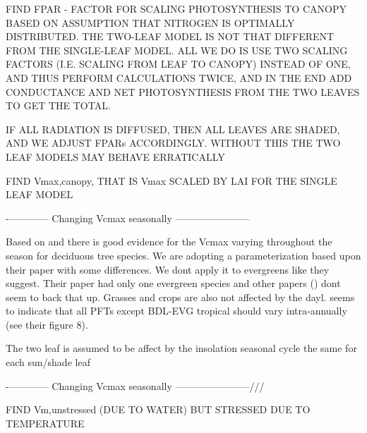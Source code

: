 F\+I\+N\+D F\+P\+A\+R -\/ F\+A\+C\+T\+O\+R F\+O\+R S\+C\+A\+L\+I\+N\+G P\+H\+O\+T\+O\+S\+Y\+N\+T\+H\+E\+S\+I\+S T\+O C\+A\+N\+O\+P\+Y B\+A\+S\+E\+D O\+N A\+S\+S\+U\+M\+P\+T\+I\+O\+N T\+H\+A\+T N\+I\+T\+R\+O\+G\+E\+N I\+S O\+P\+T\+I\+M\+A\+L\+L\+Y D\+I\+S\+T\+R\+I\+B\+U\+T\+E\+D. T\+H\+E T\+W\+O-\/\+L\+E\+A\+F M\+O\+D\+E\+L I\+S N\+O\+T T\+H\+A\+T D\+I\+F\+F\+E\+R\+E\+N\+T F\+R\+O\+M T\+H\+E S\+I\+N\+G\+L\+E-\/\+L\+E\+A\+F M\+O\+D\+E\+L. A\+L\+L W\+E D\+O I\+S U\+S\+E T\+W\+O S\+C\+A\+L\+I\+N\+G F\+A\+C\+T\+O\+R\+S (I.\+E. S\+C\+A\+L\+I\+N\+G F\+R\+O\+M L\+E\+A\+F T\+O C\+A\+N\+O\+P\+Y) I\+N\+S\+T\+E\+A\+D O\+F O\+N\+E, A\+N\+D T\+H\+U\+S P\+E\+R\+F\+O\+R\+M C\+A\+L\+C\+U\+L\+A\+T\+I\+O\+N\+S T\+W\+I\+C\+E, A\+N\+D I\+N T\+H\+E E\+N\+D A\+D\+D C\+O\+N\+D\+U\+C\+T\+A\+N\+C\+E A\+N\+D N\+E\+T P\+H\+O\+T\+O\+S\+Y\+N\+T\+H\+E\+S\+I\+S F\+R\+O\+M T\+H\+E T\+W\+O L\+E\+A\+V\+E\+S T\+O G\+E\+T T\+H\+E T\+O\+T\+A\+L.

I\+F A\+L\+L R\+A\+D\+I\+A\+T\+I\+O\+N I\+S D\+I\+F\+F\+U\+S\+E\+D, T\+H\+E\+N A\+L\+L L\+E\+A\+V\+E\+S A\+R\+E S\+H\+A\+D\+E\+D, A\+N\+D W\+E A\+D\+J\+U\+S\+T F\+P\+A\+Rs A\+C\+C\+O\+R\+D\+I\+N\+G\+L\+Y. W\+I\+T\+H\+O\+U\+T T\+H\+I\+S T\+H\+E T\+W\+O L\+E\+A\+F M\+O\+D\+E\+L\+S M\+A\+Y B\+E\+H\+A\+V\+E E\+R\+R\+A\+T\+I\+C\+A\+L\+L\+Y

F\+I\+N\+D Vmax,canopy, T\+H\+A\+T I\+S Vmax S\+C\+A\+L\+E\+D B\+Y L\+A\+I F\+O\+R T\+H\+E S\+I\+N\+G\+L\+E L\+E\+A\+F M\+O\+D\+E\+L

-\/------------ Changing Vcmax seasonally -----------------------

Based on \cite{Bauerle2012-c29} and \cite{Alton2017-pd} there is good evidence for the Vcmax varying throughout the season for deciduous tree species. We are adopting a parameterization based upon their paper with some differences. We don\textquotesingle{}t apply it to evergreens like they suggest. Their paper had only one evergreen species and other papers (\cite{Miyazawa2006-so}) don\textquotesingle{}t seem to back that up. Grasses and crops are also not affected by the dayl. \cite{Alton2017-pd} seems to indicate that all P\+F\+Ts except B\+D\+L-\/\+E\+V\+G tropical should vary intra-\/annually (see their figure 8).

The two leaf is assumed to be affect by the insolation seasonal cycle the same for each sun/shade leaf

-\/------------ Changing Vcmax seasonally -----------------------///

F\+I\+N\+D Vm,unstressed (D\+U\+E T\+O W\+A\+T\+E\+R) B\+U\+T S\+T\+R\+E\+S\+S\+E\+D D\+U\+E T\+O T\+E\+M\+P\+E\+R\+A\+T\+U\+R\+E

